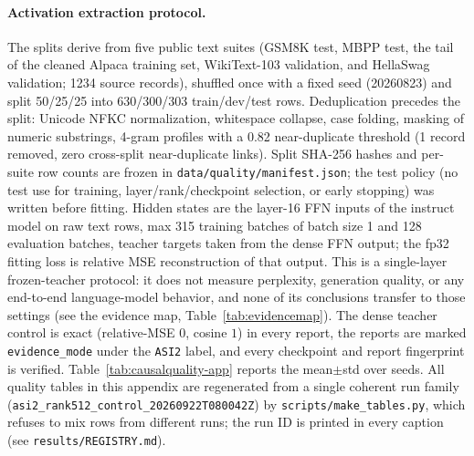 \paragraph{Activation extraction protocol.}
The splits derive from five public text suites (GSM8K test, MBPP test, the
tail of the cleaned Alpaca training set, WikiText-103 validation, and
HellaSwag validation; 1234 source records), shuffled once with a fixed seed
(20260823) and split 50/25/25 into 630/300/303 train/dev/test rows.  Deduplication
precedes the split: Unicode NFKC normalization, whitespace collapse, case
folding, masking of numeric substrings, 4-gram profiles with a 0.82
near-duplicate threshold (1 record removed, zero cross-split near-duplicate
links).  Split SHA-256 hashes and per-suite row counts are frozen in
\texttt{data/quality/manifest.json}; the test policy (no test use for
training, layer/rank/checkpoint selection, or early stopping) was written
before fitting.  Hidden states are the layer-16 FFN inputs of the instruct
model on raw text rows, max 315 training batches of batch size 1 and 128
evaluation batches, teacher targets taken from the dense FFN output; the
fp32 fitting loss is relative MSE reconstruction of that output.  This is a
single-layer frozen-teacher protocol: it does not measure perplexity,
generation quality, or any end-to-end language-model behavior, and none of
its conclusions transfer to those settings (see the evidence map,
Table~\ref{tab:evidencemap}). The dense teacher control is exact
(relative-MSE $0$, cosine $1$) in every report, the reports are marked
\texttt{evidence\_mode} under the \texttt{ASI2} label, and every checkpoint
and report fingerprint is verified. Table~\ref{tab:causalquality-app}
reports the mean$\pm$std over seeds. All quality tables in this appendix are
regenerated from a single coherent run family
(\texttt{asi2\_rank512\_control\_20260922T080042Z}) by
\texttt{scripts/make\_tables.py}, which refuses to mix rows from different
runs; the run ID is printed in every caption
(see \texttt{results/REGISTRY.md}).

